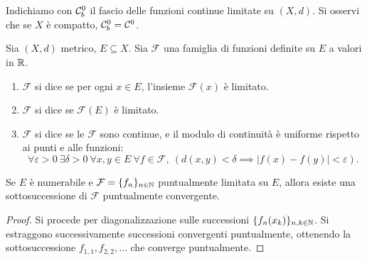 Indichiamo con $\mathcal{C}^0_b$ il fascio delle funzioni continue limitate su $(X,d)$. Si osservi che se $X$ è compatto, $\mathcal{C}^0_b = \mathcal{C}^0$.

\begin{definition}
	Sia $(X,d)$ metrico, $E \subseteq X$.
	Sia $\mathcal F$ una famiglia di funzioni definite su $E$ a valori in $\mathbb{R}$.
	\begin{enumerate}
		\item $\mathcal F$ si dice  se per ogni $x \in E$, l'insieme $\mathcal F(x)$ è limitato.
		\item $\mathcal F$ si dice  se $\mathcal F(E)$ è limitato.
		\item $\mathcal F$ si dice  se le $\mathcal F$ sono continue, e il modulo di continuità è uniforme rispetto ai punti e alle funzioni:
		\begin{equation*}
			\forall \varepsilon > 0\ \exists \delta > 0\ \forall x,y \in E\ \forall f \in \mathcal F,\ (d(x,y) < \delta \implies |f(x) - f(y)| < \varepsilon).
		\end{equation*}
	\end{enumerate}
\end{definition}

\begin{lemma}
\label{lemma:funsp_three}
	Se $E$ è numerabile e $\mathcal F = \{f_n\}_{n \in \mathbb{N}}$ puntualmente limitata su $E$, allora esiste una sottosuccessione di $\mathcal F$ puntualmente convergente.
\end{lemma}
\begin{proof}
	Si procede per diagonalizzazione sulle successioni $\{f_n(x_k)\}_{n,k \in \mathbb{N}}$. Si estraggono successivamente successioni convergenti puntualmente, ottenendo la sottosuccessione $f_{1,1}, f_{2,2}, \ldots$ che converge puntualmente.
\end{proof}

